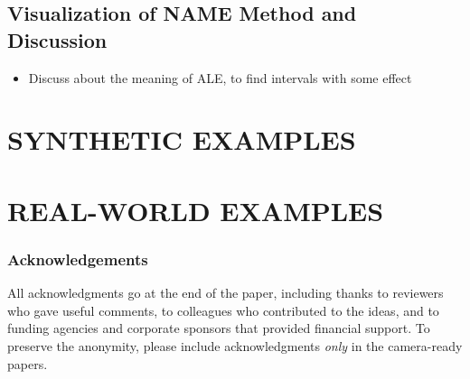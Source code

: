 \documentclass[twoside]{article}
\begin{document}
\subsection{Visualization of NAME Method and Discussion}
\label{sec:visualization}

\begin{itemize}
\item Discuss about the meaning of ALE, to find intervals with some effect
\end{itemize}

\section{SYNTHETIC EXAMPLES}

\section{REAL-WORLD EXAMPLES}


\subsubsection*{Acknowledgements}
All acknowledgments go at the end of the paper, including thanks to reviewers who gave useful comments, to colleagues who contributed to the ideas, and to funding agencies and corporate sponsors that provided financial support. 
To preserve the anonymity, please include acknowledgments \emph{only} in the camera-ready papers.


\end{document}
